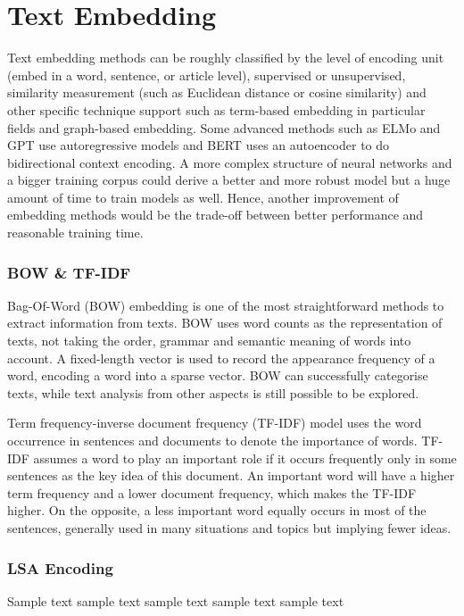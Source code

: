 \section{Text Embedding}
Text embedding methods can be roughly classified by the level of encoding unit (embed in a word, sentence, or article level), supervised or unsupervised, similarity measurement (such as Euclidean distance or cosine similarity) and other specific technique support such as term-based embedding in particular fields and graph-based embedding.
Some advanced methods such as ELMo\cite{peters2018} and GPT\cite{brown2020} use autoregressive models and BERT\cite{niven2019} uses an autoencoder to do bidirectional context encoding.
A more complex structure of neural networks and a bigger training corpus could derive a better and more robust model but a huge amount of time to train models as well.
Hence, another improvement of embedding methods would be the trade-off between better performance and reasonable training time.

\subsubsection{BOW \& TF-IDF}
Bag-Of-Word (BOW) embedding is one of the most straightforward methods to extract information from texts.
BOW uses word counts as the representation of texts, not taking the order, grammar and semantic meaning of words into account.
A fixed-length vector is used to record the appearance frequency of a word, encoding a word into a sparse vector.\cite{sethy2008}
BOW can successfully categorise texts\cite{zhang2010}, while text analysis from other aspects is still possible to be explored.

Term frequency-inverse document frequency (TF-IDF) model uses the word occurrence in sentences and documents to denote the importance of words.
TF-IDF assumes a word to play an important role if it occurs frequently only in some sentences as the key idea of this document.
An important word will have a higher term frequency and a lower document frequency, which makes the TF-IDF higher.
On the opposite, a less important word equally occurs in most of the sentences, generally used in many situations and topics but implying fewer ideas.\cite{li2011}


\subsubsection{LSA Encoding}
Sample text sample text sample text sample text sample text

